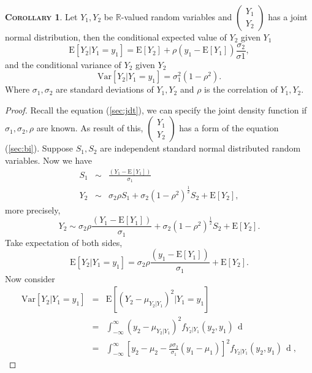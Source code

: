 \documentclass[a4paper, twoside, 11pt]{article}
\theoremstyle{definition}
\newtheorem{corollary}[definition]{\scshape Corollary}
\newcommand{\sqbr}[1]{\left[ {#1} \right]}
\begin{document}
\begin{corollary}
  Let $Y_1, Y_2$ be $\mathbb{R}$-valued random variables and $\left(
    \begin{array}{c}
      Y_1 \\
      Y_2
    \end{array}
	\right)$  has a joint normal distribution, then the conditional expected value of $Y_2$ given $Y_1$
    $$
	\mathrm{E}[Y_2| Y_1=y_1] = \mathrm{E}[Y_2] + \rho (y_1 - \mathrm{E}[Y_1])\frac{\sigma_2}{\sigma1},
	$$
	and the conditional variance of $Y_2$ given $Y_2$
	$$
		\mathrm{Var}[Y_2| Y_1 = y_1] = \sigma_1^2 (1 - \rho^2).
	$$
	Where $\sigma_1, \sigma_2$ are standard deviations of $Y_1, Y_2$ and $\rho$ is the correlation of $Y_1, Y_2$.
	\label{sec:condi}
\end{corollary}

\begin{proof}
  Recall the equation (\ref{sec:jdt}), we can specify the joint density function if $\sigma_1, \sigma_2, \rho$ are known. As result of this,
  $\left(
    \begin{array}{c}
      Y_1 \\
      Y_2
    \end{array}
	\right)$ has a form of the equation (\ref{sec:bi}).
  Suppose $S_1, S_2$ are independent standard normal distributed random variables. Now we have
  \begin{eqnarray*}
	S_1 &\sim& \frac{(Y_1 - \mathrm{E}[Y_1])}{\sigma_1} \\
	Y_2 &\sim& \sigma_2\rho S_1 + \sigma_2(1-\rho^2)^{\frac{1}{2}} S_2 + \mathrm{E}[Y_2],
  \end{eqnarray*}
  more precisely,
  $$
  Y_2 \sim \sigma_2\rho \frac{(Y_1 - \mathrm{E}[Y_1])}{\sigma_1}  + \sigma_2(1-\rho^2)^{\frac{1}{2}} S_2 + \mathrm{E}[Y_2].
  $$
  Take expectation of both sides, 
  \begin{equation*}
	\mathrm{E}[Y_2|Y_1=y_1] = \sigma_2\rho \frac{(y_1 - \mathrm{E}[Y_1])}{\sigma_1} + \mathrm{E}[Y_2].
  \end{equation*}
  Now consider
  \begin{eqnarray*}
	\mathrm{Var}[Y_2|Y_1=y_1] &=&  \mathrm{E}[(Y_2 - \mu_{Y_2|Y_1})^2|Y_1=y_1]\\
							  &=& \int_{-\infty}^{\infty}(y_2 - \mu_{Y_2|Y_1})^2f_{Y_2|Y_1}(y_2, y_1)\,\mathop{dy_2}\\
							  &=& \int_{-\infty}^{\infty}\sqbr{y_2 - \mu_2 - \frac{\rho\sigma_2}{\sigma_1}(y_1-\mu_1)}^2f_{Y_2|Y_1}(y_2, y_1)\,\mathop{dy_2},
  \end{eqnarray*}

\end{proof}
\end{document}
